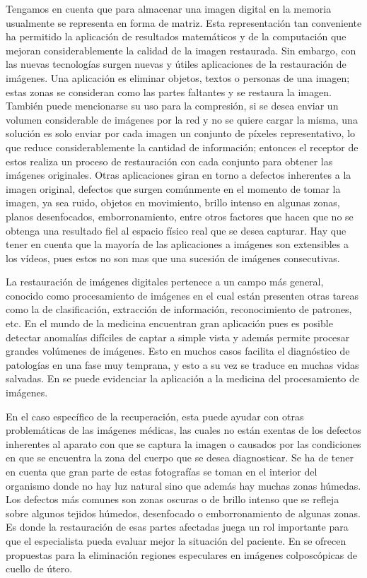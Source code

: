 Tengamos en cuenta que para almacenar una imagen digital en la memoria usualmente se representa en forma de matriz. Esta representaci\'on tan conveniente ha permitido la aplicaci\'on de resultados matem\'aticos y de la computaci\'on que mejoran considerablemente la calidad de la imagen restaurada. Sin embargo, con las nuevas tecnolog\'ias surgen nuevas y \'utiles aplicaciones de la restauraci\'on de im\'agenes. Una aplicaci\'on es eliminar objetos, textos o personas de una imagen; estas zonas se consideran como las partes faltantes y se restaura la imagen. También puede mencionarse su uso para la compresi\'on, si se desea enviar un volumen considerable de imágenes por la red y no se quiere cargar la misma, una solución es solo enviar por cada imagen un conjunto de p\'ixeles representativo, lo que reduce considerablemente la cantidad de informaci\'on; entonces el receptor de estos realiza un proceso de restauraci\'on con cada conjunto para obtener las imágenes originales. Otras aplicaciones giran en torno a defectos inherentes a la imagen original, defectos que surgen comúnmente en el momento de tomar la imagen, ya sea ruido, objetos en movimiento, brillo intenso en algunas zonas, planos desenfocados, emborronamiento, entre otros factores que hacen que no se obtenga una resultado fiel al espacio físico real que se desea capturar. Hay que tener en cuenta que la mayor\'ia de las aplicaciones a im\'agenes son extensibles a los vídeos, pues estos no son mas que una sucesión de imágenes consecutivas.

La restauraci\'on de im\'agenes digitales pertenece a un campo m\'as general, conocido como procesamiento de im\'agenes en el cual est\'an presenten otras tareas como la de clasificaci\'on, extracci\'on de informaci\'on, reconocimiento de patrones, etc. En el mundo de la medicina encuentran gran aplicaci\'on pues es posible detectar anomalías difíciles de captar a simple vista y adem\'as permite procesar grandes volúmenes de imágenes. Esto en muchos casos facilita el diagn\'ostico de patologías en una fase muy temprana, y esto a su vez se traduce en muchas vidas salvadas. En \cite{afals2016tesis} se puede evidenciar la aplicaci\'on a la medicina del procesamiento de im\'agenes.

En el caso espec\'ifico de la recuperaci\'on, esta puede ayudar con otras problemáticas de las im\'agenes m\'edicas, las cuales no est\'an exentas de los defectos inherentes al aparato con que se captura la imagen o causados por las condiciones en que se encuentra la zona del cuerpo que se desea diagnosticar. Se ha de tener en cuenta que gran parte de estas fotograf\'ias se toman en el interior del organismo donde no hay luz natural sino que adem\'as hay muchas zonas h\'umedas. Los defectos m\'as comunes son zonas oscuras o de brillo intenso que se refleja sobre algunos tejidos h\'umedos, desenfocado o emborronamiento de algunas zonas. Es donde la restauraci\'on de esas partes afectadas juega un rol importante para que el especialista pueda evaluar mejor la situaci\'on del paciente. En \cite{dgomez2018tesis,apalmer2015tesis} se ofrecen propuestas para la eliminaci\'on regiones especulares en imágenes colposcópicas de cuello de útero.

